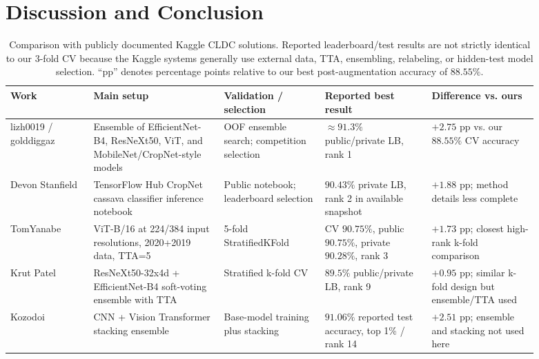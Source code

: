 \documentclass[conference]{IEEEtran}
\begin{document}

\section{Discussion and Conclusion}
\label{sec:discussion}

\begin{table}[t]
\centering
\caption{Comparison with publicly documented Kaggle CLDC solutions. Reported leaderboard/test results are not strictly identical to our 3-fold CV because the Kaggle systems generally use external data, TTA, ensembling, relabeling, or hidden-test model selection. ``pp'' denotes percentage points relative to our best post-augmentation accuracy of $88.55\%$.}
\label{tab:kaggle_comparison}
\footnotesize
\setlength{\tabcolsep}{2.5pt}
\begin{tabular}{p{0.14\linewidth} p{0.22\linewidth} p{0.17\linewidth} p{0.18\linewidth} p{0.18\linewidth}}
\toprule
Work & Main setup & Validation / selection & Reported best result & Difference vs. ours \\
\midrule
lizh0019 / golddiggaz~\cite{lizh0019cassava} & Ensemble of EfficientNet-B4, ResNeXt50, ViT, and MobileNet/CropNet-style models & OOF ensemble search; competition selection & $\approx 91.3\%$ public/private LB, rank 1 & $+2.75$ pp vs. our $88.55\%$ CV accuracy \\
Devon Stanfield~\cite{devonstanfield2021cassava} & TensorFlow Hub CropNet cassava classifier inference notebook & Public notebook; leaderboard selection & $90.43\%$ private LB, rank 2 in available snapshot & $+1.88$ pp; method details less complete \\
TomYanabe~\cite{tomyanabe2021cassava} & ViT-B/16 at 224/384 input resolutions, 2020+2019 data, TTA=5 & 5-fold StratifiedKFold & CV $90.75\%$, public $90.75\%$, private $90.28\%$, rank 3 & $+1.73$ pp; closest high-rank k-fold comparison \\
Krut Patel~\cite{krutpatel2021cassava} & ResNeXt50-32x4d + EfficientNet-B4 soft-voting ensemble with TTA & Stratified k-fold CV & $89.5\%$ public/private LB, rank 9 & $+0.95$ pp; similar k-fold design but ensemble/TTA used \\
Kozodoi~\cite{kozodoi2021cassava} & CNN + Vision Transformer stacking ensemble & Base-model training plus stacking & $91.06\%$ reported test accuracy, top 1\% / rank 14 & $+2.51$ pp; ensemble and stacking not used here \\

\end{tabular}
\end{table}
\end{document}
